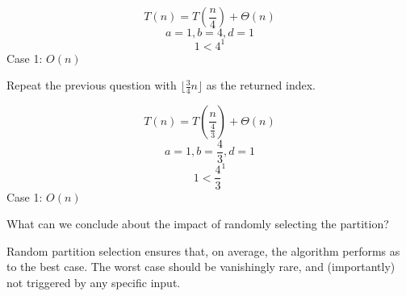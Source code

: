 \documentclass{tufte-handout}
\begin{document}
\begin{questions}
{\color{red} 
\[ T(n) = T(\frac{n}{4}) + \Theta(n) \]
\[a = 1, b = 4, d = 1\] 
\[1 < 4^1\]
Case 1: $O(n)$
}

\item Repeat the previous question with $\lfloor \frac{3}{4} n \rfloor$ as the returned index. 

{\color{red} 
\[ T(n) = T(\frac{n}{\frac{4}{3}}) + \Theta(n) \]
\[a = 1, b = \frac{4}{3}, d = 1\] 
\[1 < \frac{4}{3}^1\]
Case 1: $O(n)$
}

\item What can we conclude about the impact of randomly selecting the partition?

{\color{red} Random partition selection ensures that, on average, the algorithm performs as to the best case. The worst case should be vanishingly rare, and (importantly) not triggered by any specific input.}

\end{questions}
\end{document}

